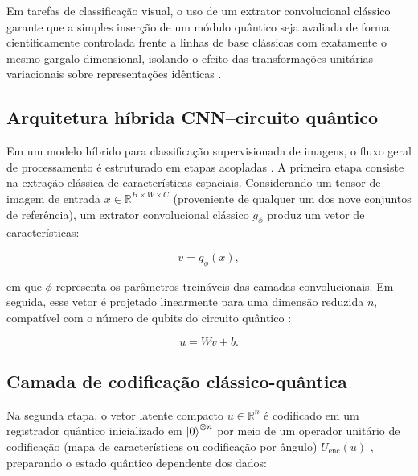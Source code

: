 \documentclass[
    12pt,
    openright,
    oneside,
    a4paper,
    english,
    brazil
]{abntex2}
\begin{document}
Em tarefas de classificação visual, o uso de um extrator convolucional clássico garante que a simples inserção de um módulo quântico seja avaliada de forma cientificamente controlada frente a linhas de base clássicas com exatamente o mesmo gargalo dimensional, isolando o efeito das transformações unitárias variacionais sobre representações idênticas \cite{Wazlawick2020,cerezo2021variational}.

\subsection{Arquitetura híbrida CNN--circuito quântico}

Em um modelo híbrido para classificação supervisionada de imagens, o fluxo geral de processamento é estruturado em etapas acopladas \cite{cerezo2021variational,bergholm2018pennylane}. A primeira etapa consiste na extração clássica de características espaciais. Considerando um tensor de imagem de entrada \(x \in \mathbb{R}^{H \times W \times C}\) (proveniente de qualquer um dos nove conjuntos de referência), um extrator convolucional clássico \(g_{\phi}\) produz um vetor de características:

\begin{equation}
\label{eq:extrator_hibrido}
v = g_{\phi}(x),
\end{equation}

em que \(\phi\) representa os parâmetros treináveis das camadas convolucionais. Em seguida, esse vetor é projetado linearmente para uma dimensão reduzida \(n\), compatível com o número de qubits do circuito quântico \cite{senokosov2024qml,cerezo2021variational}:

\begin{equation}
\label{eq:projecao_gargalo}
u = Wv + b.
\end{equation}

\subsection{Camada de codificação clássico-quântica}
\label{subsec:camada_codificacao_classico_quantica}

Na segunda etapa, o vetor latente compacto \(u \in \mathbb{R}^{n}\) é codificado em um registrador quântico inicializado em \(\ket{0}^{\otimes n}\) por meio de um operador unitário de codificação (mapa de características ou codificação por ângulo) \(U_{\text{enc}}(u)\) \cite{schuld2021effect,perezsalinas2020data}, preparando o estado quântico dependente dos dados:
\end{document}
